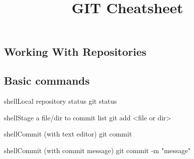 \documentclass[10pt,a4paper]{article}
\title{\color{w3schools}GIT Cheatsheet
}
\begin{document}
\maketitle
\small
\begin{multicols}{3}

\thispagestyle{empty}
\scriptsize

% 




\section{Working With Repositories}

\subsection{Basic commands}

\begin{codebox}{shell}{Local repository status}
git status

\end{codebox}

\begin{codebox}{shell}{Stage a file/dir to commit list}
git add <file or dir>

\end{codebox}

\begin{codebox}{shell}{Commit (with text editor)}
git commit

\end{codebox}

\begin{codebox}{shell}{Commit (with commit message)}
git commit -m "message"

\end{codebox}


\end{multicols}
\end{document}
